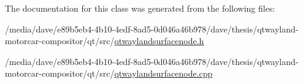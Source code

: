 The documentation for this class was generated from the following files\-:\begin{DoxyCompactItemize}
\item 
/media/dave/e89b5eb4-\/4b10-\/4edf-\/8ad5-\/0d046a46b978/dave/thesis/qtwayland-\/motorcar-\/compositor/qt/src/\hyperlink{qtwaylandsurfacenode_8h}{qtwaylandsurfacenode.\-h}\item 
/media/dave/e89b5eb4-\/4b10-\/4edf-\/8ad5-\/0d046a46b978/dave/thesis/qtwayland-\/motorcar-\/compositor/qt/src/\hyperlink{qtwaylandsurfacenode_8cpp}{qtwaylandsurfacenode.\-cpp}\end{DoxyCompactItemize}
